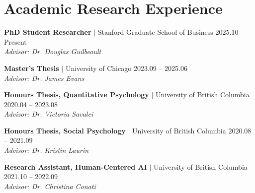 \documentclass[11pt,letterpaper]{article}
\newcommand{\advisor}[1]{\hspace*{1em}\textit{Advisor: #1}}
\begin{document}
\section*{Academic Research Experience}

\noindent\begin{minipage}{\textwidth}
\noindent\textbf{PhD Student Researcher} $|$ Stanford Graduate School of Business \hfill 2025.10 -- Present\\
\noindent\advisor{Dr. Douglas Guilbeault}
\end{minipage}

\vspace{0.5em}
\noindent\begin{minipage}{\textwidth}
\noindent\textbf{Master's Thesis} $|$ University of Chicago \hfill 2023.09 -- 2025.06\\
\noindent\advisor{Dr. James Evans}
\end{minipage}

\vspace{0.5em}
\noindent\begin{minipage}{\textwidth}
\noindent\textbf{Honours Thesis, Quantitative Psychology} $|$ University of British Columbia \hfill 2020.04 -- 2023.08\\
\noindent\advisor{Dr. Victoria Savalei}
\end{minipage}

\vspace{0.5em}
\noindent\begin{minipage}{\textwidth}
\noindent\textbf{Honours Thesis, Social Psychology} $|$ University of British Columbia \hfill 2020.08 -- 2021.09\\
\noindent\advisor{Dr. Kristin Laurin}
\end{minipage}

\vspace{0.5em}
\noindent\begin{minipage}{\textwidth}
\noindent\textbf{Research Assistant, Human-Centered AI} $|$ University of British Columbia \hfill 2021.10 -- 2022.09\\
\noindent\advisor{Dr. Christina Conati}
\end{minipage}

\end{document}
